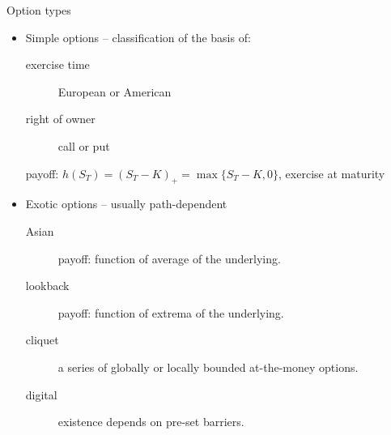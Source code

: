 \documentclass[utf8,t,compress,xcolor=svgnames,handout]{beamer}
\begin{document}
	
	\begin{frame}{Option types}
		\begin{itemize}
			\item Simple options -- classification of the basis of:
			\begin{description}
				\item[exercise time] European or American
				\item[right of owner] call or put
			\end{description}
			\begin{example}
				payoff: $ h(S_T) = (S_T - K)_+ = \max \{S_T - K, 0\} $, exercise at maturity
			\end{example}
			\item Exotic options -- usually path-dependent
			\begin{description}
				\item[\alert{Asian}] payoff: function of average of the underlying.
				\item[lookback] payoff: function of extrema of the underlying.
				\item[\alert{cliquet}] a series of globally or locally bounded at-the-money options.
				\item[digital] existence depends on pre-set barriers.
			\end{description}
		\end{itemize}
	\end{frame}
	
\end{document}

